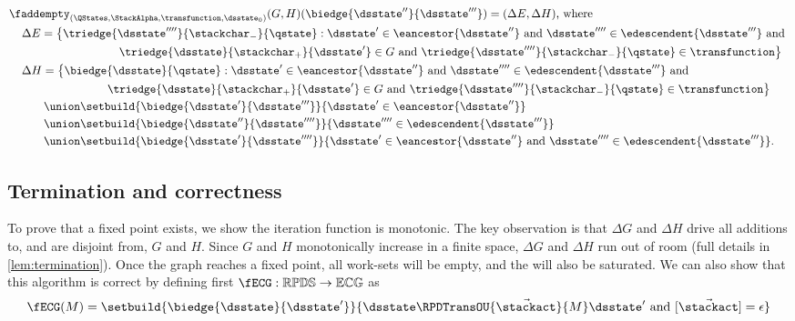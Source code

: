 \begin{align*}
  &\faddempty_{(\QStates,\StackAlpha,\transfunction,\dsstate_0)} (G,H) (\biedge{\dsstate''}{\dsstate'''})
  = (\Delta E, \Delta H)\text{, where }
  \\
  &\;\;\;\;\Delta E = \big\{ \triedge{\dsstate''''}{\stackchar_-}{\qstate} :
    \dsstate' \in \eancestor{\dsstate''}
    \text{ and }
    \dsstate'''' \in \edescendent{\dsstate'''}
    \text{ and } \\
    & \hspace{9.5em} \triedge{\dsstate}{\stackchar_+}{\dsstate'} \in G
    \text{ and }
    \triedge{\dsstate''''}{\stackchar_-}{\qstate} \in \transfunction \big\}
  \\
  &\;\;\;\;\Delta H = \big\{ \biedge{\dsstate}{\qstate} :
    \dsstate' \in \eancestor{\dsstate''}
    \text{ and }
    \dsstate'''' \in \edescendent{\dsstate'''}
    \text{ and } \\
    & \hspace{8.5em} \triedge{\dsstate}{\stackchar_+}{\dsstate'} \in G
    \text{ and }
    \triedge{\dsstate''''}{\stackchar_-}{\qstate} \in \transfunction \big\}
  \\
  & \hspace{3em} \union \setbuild{ \biedge{\dsstate'}{\dsstate'''}  }{
    \dsstate' \in \eancestor{\dsstate''}
  }
  \\
  & \hspace{3em} \union \setbuild{ \biedge{\dsstate''}{\dsstate''''}  }{
    \dsstate'''' \in \edescendent{\dsstate'''}
   }
  \\
  & \hspace{3em} \union \setbuild{ \biedge{\dsstate'}{\dsstate''''}  }{
    \dsstate' \in \eancestor{\dsstate''}
    \text{ and }
    \dsstate'''' \in \edescendent{\dsstate'''}
  }
  \text.
\end{align*}





\subsection{Termination and correctness}
To prove that a fixed point exists, we show the iteration function is monotonic.
The key observation is that $\Delta G$ and $\Delta H$ drive all additions to, and are disjoint from, $G$ and $H$.
Since $G$ and $H$ monotonically increase in a finite space, $\Delta G$ and $\Delta H$ run out of room (full details in \autoref{lem:termination}).
Once the graph reaches a fixed point, all work-sets will be empty, and the \ecg{} will also be saturated.
We can also show that this algorithm is correct by defining first 
$\fECG : \mathbb{RPDS} \to \mathbb{ECG}$ as
\begin{equation*}
  \fECG(M) = \setbuild{\biedge{\dsstate}{\dsstate'}}{\dsstate \RPDTransOU{\vec{\stackact}}{M} \dsstate' \text{ and } [\vec{\stackact}] = \epsilon}
\end{equation*}

